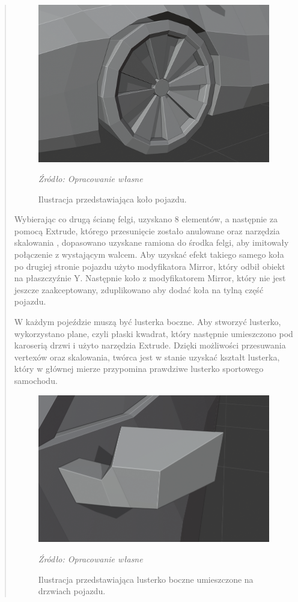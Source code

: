 \begin{quotation}
\begin{figure}[!hbt]
\centering
  \includegraphics[width=0.7\linewidth]{opona.png}
  \caption{Ilustracja przedstawiająca koło pojazdu.}\label{rys_11}
  \begin{minipage}[t]{0.75\linewidth}
    \emph{Źródło: Opracowanie własne}
  \end{minipage}
\end{figure}

Wybierając co drugą ścianę felgi, uzyskano 8 elementów, a następnie za pomocą Extrude, którego przesunięcie zostało anulowane oraz narzędzia skalowania , dopasowano uzyskane ramiona do środka felgi, aby imitowały połączenie z wystającym walcem. Aby uzyskać efekt takiego samego koła po drugiej stronie pojazdu użyto modyfikatora Mirror, który odbił obiekt na płaszczyźnie Y. Następnie koło z modyfikatorem Mirror, który nie jest jeszcze zaakceptowany, zduplikowano aby dodać koła na tylną część pojazdu.

\indent W każdym pojeździe muszą być lusterka boczne. Aby stworzyć lusterko, wykorzystano plane, czyli płaski kwadrat, który następnie umieszczono pod karoserią drzwi i użyto narzędzia Extrude. Dzięki możliwości przesuwania vertexów oraz skalowania, twórca jest w stanie uzyskać kształt lusterka, który w głównej mierze przypomina prawdziwe lusterko sportowego samochodu.

\begin{figure}[!hbt]
\centering
  \includegraphics[width=0.8\linewidth]{lusterko.png}
  \caption{Ilustracja przedstawiająca lusterko boczne umieszczone na drzwiach pojazdu.}\label{rys_12}
  \begin{minipage}[t]{0.75\linewidth}
    \emph{Źródło: Opracowanie własne}
  \end{minipage}
\end{figure}


\end{quotation}
